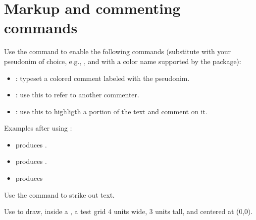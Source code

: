 \section*{Markup and commenting commands}
Use the command  to enable the following commands (substitute  with your pseudonim of choice, e.g., , and  with a color name supported by the  package):
\begin{itemize}
\item {}: typeset a colored comment labeled with the pseudonim.
\item {}: use this to refer to another commenter.
\item {}: use this to highligth a portion of the text and comment on it.
\end{itemize}
Examples after using :
\begin{itemize}
\item {} produces .
\item {} produces \atrtron.
\item {} produces 
\end{itemize}

Use the command  to strike out text.

Use  to draw, inside a , a test grid 4 units wide, 3 units tall, and centered at (0,0).
